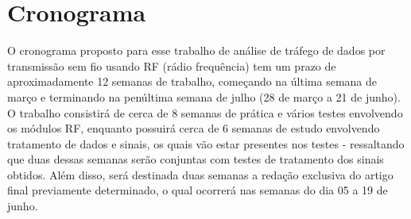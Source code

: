 \documentclass[conference]{IEEEtran}
\begin{document}
%
%




\section{Cronograma}

O cronograma proposto para esse trabalho de an\'alise de tr\'afego de dados por transmiss\~ao sem fio usando RF (r\'adio frequ\^encia) tem um prazo de aproximadamente 12 semanas de trabalho, come\c{c}ando na \'ultima semana de mar\c{c}o e terminando na pen\'ultima semana de julho (28 de mar\c{c}o a 21 de junho). O trabalho consistir\'a de cerca de 8 semanas de pr\'atica e v\'arios testes envolvendo os m\'odulos RF, enquanto possuir\'a cerca de 6 semanas de estudo envolvendo tratamento de dados e sinais, os quais v\~ao estar presentes nos testes - ressaltando que duas dessas semanas ser\~ao conjuntas com testes de tratamento dos sinais obtidos. Al\'em disso, ser\'a destinada duas semanas a reda\c{c}\~ao exclusiva do artigo final previamente determinado, o qual ocorrer\'a nas semanas do dia 05 a 19 de junho.
\end{document}
